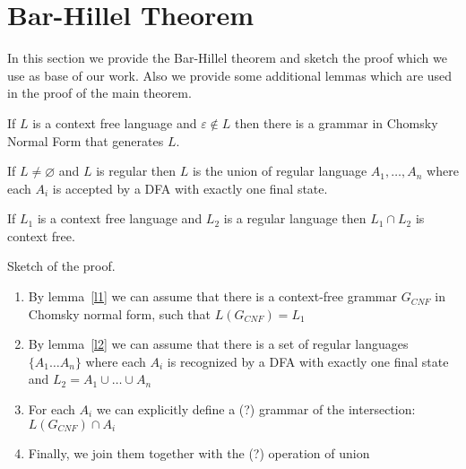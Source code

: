\section{Bar-Hillel Theorem}
\label{sec:b-h-th}

In this section we provide the Bar-Hillel theorem and sketch the proof which we use as base of our work.
Also we provide some additional lemmas which are used in the proof of the main theorem.

\begin{lemma} \label{l1}
	If $L$ is a context free language and $\varepsilon \notin L$ then there is a grammar in Chomsky Normal Form that generates $L$.
\end{lemma}

\begin{lemma} \label{l2}
	If $ L \neq \varnothing $ and $L$ is regular then $L$ is the union of regular language $A_1, \ldots , A_n$ where each $A_i$ is accepted by a DFA with exactly one final state.
\end{lemma}

\begin{theorem}
	If $L_1$ is a context free language and $L_2$ is a regular language then $L_1 \cap L_2$ is context free.
\end{theorem}


Sketch of the proof.
\begin{enumerate}
	\item By lemma~\ref{l1} we can assume that there is a context-free grammar $G_{CNF}$ in Chomsky normal form, such that $L(G_{CNF}) = L_1$
	\item By lemma~\ref{l2} we can assume that there is a set of regular languages $\{A_{1} \ldots A_n \}$ where each $A_i$ is recognized by a DFA with exactly one final state and $L_2 = A_1 \cup \ldots \cup A_n$
	\item For each $A_i$ we can explicitly define a (?) grammar of the intersection: $L( G_{CNF} ) \cap A_i$
	\item Finally, we join them together with the (?) operation of union
\end{enumerate}
